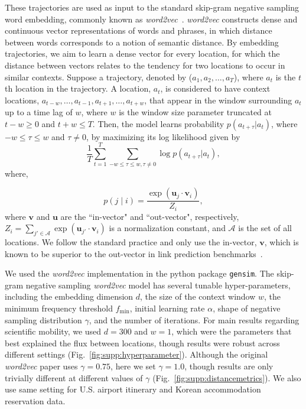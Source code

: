 \documentclass[12pt]{article} %
\def\given{\mid}
\begin{document}
These trajectories are used as input to the standard skip-gram negative sampling word embedding, commonly known as \textit{word2vec}~\autocite{mikolov2013word2vec}.
\textit{word2vec} constructs dense and continuous vector representations of words and phrases, in which distance between words corresponds to a notion of semantic distance.
By embedding trajectories, we aim to learn a dense vector for every location, for which the distance between vectors relates to the tendency for two locations to occur in similar contexts.
Suppose a trajectory, denoted by ($a_{1}, a_{2}, \ldots, a_{T}$), where $a_{t}$ is the $t$th location in the trajectory. A location, $a_{t}$, is considered to have context locations, $a_{t-w}, \ldots, a_{t-1}, a_{t+1},\ldots, a_{t+w}$, that appear in the window surrounding $a_t$ up to a time lag of $w$, where $w$ is the window size parameter truncated at $t - w \geq 0$ and $t + w \leq T$. Then, the model learns probability $p(a_{t + \tau} \vert a_{t})$, where $-w\leq \tau\leq w$ and $\tau \neq 0$,  by maximizing its log likelihood given by
%
%
\begin{equation}
	\frac{1}{T}\sum_{t = 1}^{T} \sum_{-w \leq \tau \leq w, \tau \neq 0} \log p(a_{t + \tau} \vert a_{t}),
\end{equation}
where,

%
%
\begin{equation}
	p(j \given i) = \frac{\exp(\bm{u}_j \cdot \bm{v}_{i})}{Z_i}, \label{eq:cond_prob_w2v}
\end{equation}
where $\bm{v}$ and $\bm{u}$ are the ``in-vector" and ``out-vector", respectively,  $Z_i=\sum_{j' \in \mathcal{A}} \exp(\bm{u}_{j'} \cdot \bm{v}_{i})$ is a normalization constant, and $\mathcal{A}$ is the set of all locations.
We follow the standard practice and only use the in-vector, $\bm{v}$,  which is known to be superior to the out-vector in link prediction benchmarks~\autocite{linzhuo2020hyperbolic, tshitoyan2019mat2vec, garg2018gender, kozlowski2018geometry, hamilton2016diachronic, le2014doc2vec, nakandala2017gendered}.


We used the \textit{word2vec}  implementation in the python package \texttt{gensim}.
The skip-gram negative sampling  \textit{word2vec} model has several tunable hyper-parameters, including the embedding dimension $d$, the size of the context window $w$, the minimum frequency threshold $f_{\min}$, initial learning rate $\alpha$, shape of negative sampling distribution $\gamma$, and the number of iterations.
For main results regarding scientific mobility, we used $d=300$ and $w=1$, which were the parameters that best explained the flux between locations, though results were robust across different settings (Fig.~\ref{fig:supp:hyperparameter}).
Although the original \textit{word2vec } paper uses $\gamma = 0.75$\autocite{mikolov2013word2vec}, here we set $\gamma = 1.0$, though results are only trivially different at different values of $\gamma$ (Fig.~\ref{fig:supp:distancemetrics}).
We also use same setting for U.S. airport itinerary and Korean accommodation reservation data.
\end{document}

